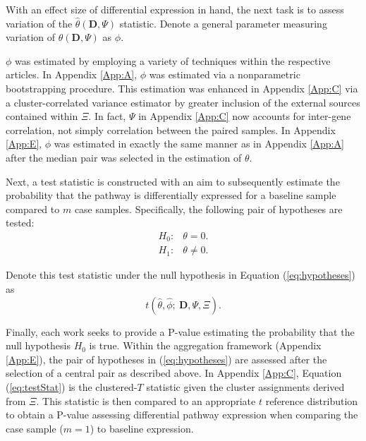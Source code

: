 With an effect size of differential expression in hand, the next task is to assess variation of the $\hat{\theta}(\mathbf{D}, \Psi)$ statistic. Denote a general parameter measuring variation of $\hat{\theta}(\mathbf{D}, \Psi)$ as $\phi$.


$\phi$ was estimated by employing a variety of techniques within the respective articles. In Appendix \ref{App:A}, $\phi$ was estimated via a nonparametric bootstrapping procedure. This estimation was enhanced in Appendix \ref{App:C} via a cluster-correlated variance estimator by greater inclusion of the external sources contained within $\Xi$. In fact, $\Psi$ in Appendix \ref{App:C} now accounts for inter-gene correlation, not simply correlation between the paired samples. In Appendix \ref{App:E}, $\phi$ was estimated in exactly the same manner as in Appendix \ref{App:A} after the median pair was selected in the estimation of $\theta$.

Next, a test statistic is constructed with an aim to subsequently estimate the probability that the pathway is differentially expressed for a baseline sample compared to $m$ case samples. Specifically, the following pair of hypotheses are tested:
\begin{equation}
  \label{eq:hypotheses}
\begin{array}{rl} \tag{3}
  H_{0}: & \theta = 0. \\
  H_{1}: & \theta \neq 0.
\end{array}
\end{equation}

\noindent \noindent Denote this test statistic under the null hypothesis in Equation (\ref{eq:hypotheses}) as
\begin{equation}
\label{eq:testStat}
t(\hat{\theta},\hat{\phi};~\mathbf{D},\Psi,\Xi). \tag{4}
\end{equation}

Finally, each work seeks to provide a P-value estimating the probability that the null hypothesis $H_{0}$ is true. Within the aggregation framework (Appendix \ref{App:E}), the pair of hypotheses in (\ref{eq:hypotheses}) are assessed after the selection of a central pair as described above. In Appendix \ref{App:C}, Equation (\ref{eq:testStat}) is the clustered-$T$ statistic given the cluster assignments derived from $\Xi$. This statistic is then compared to an appropriate $t$ reference distribution to obtain a P-value assessing differential pathway expression when comparing the case sample ($m=1$) to baseline expression. 

